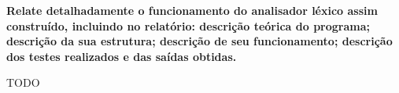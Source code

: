 
\textbf{Relate detalhadamente o funcionamento do analisador léxico assim construído, incluindo no relatório: descrição teórica do programa; descrição da sua estrutura; descrição de seu funcionamento; descrição dos testes realizados e das saídas obtidas.}

TODO
